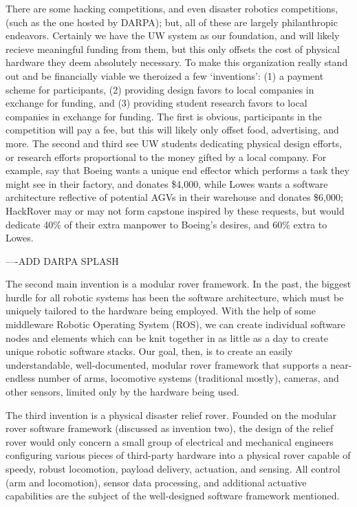 \documentclass[a4paper, 10pt]{article}
\begin{document}
		There are some hacking competitions, and even disaster robotics competitions, (such as the one hosted by DARPA); but, all of these are largely philanthropic endeavors. Certainly we have the UW system as our foundation, and will likely recieve meaningful funding from them, but this only offsets the cost of physical hardware they deem absolutely necessary. To make this organization really stand out and be financially viable we theroized a few `inventions': (1) a payment scheme for participants, (2) providing design favors to local companies in exchange for funding, and (3) providing student research favors to local companies in exchange for funding. The first is obvious, participants in the competition will pay a fee, but this will likely only offset food, advertising, and more. The second and third see UW students dedicating physical design efforts, or research efforts proportional to the money gifted by a local company. For example, say that Boeing wants a unique end effector which performs a task they might see in their factory, and donates \$4,000, while Lowes wants a software architecture reflective of potential AGVs in their warehouse and donates \$6,000; HackRover may or may not form capstone inspired by these requests, but would dedicate 40\% of their extra manpower to Boeing's desires, and 60\% extra to Lowes.
	
	----ADD DARPA SPLASH

		The second main invention is a modular rover framework. In the past, the biggest hurdle for all robotic systems has been the software architecture, which must be uniquely tailored to the hardware being employed. With the help of some middleware Robotic Operating System (ROS), we can create individual software nodes and elements which can be knit together in as little as a day to create unique robotic software stacks. Our goal, then, is to create an easily understandable, well-documented, modular rover framework that supports a near-endless number of arms, locomotive systems (traditional mostly), cameras, and other sensors, limited only by the hardware being used.	

		The third invention is a physical disaster relief rover. Founded on the modular rover software framework (discussed as invention two), the design of the relief rover would only concern a small group of electrical and mechanical engineers configuring various pieces of third-party hardware into a physical rover capable of speedy, robust locomotion, payload delivery, actuation, and sensing. All control (arm and locomotion), sensor data processing, and additional actuative capabilities are the subject of the well-designed software framework mentioned.
\end{document}
